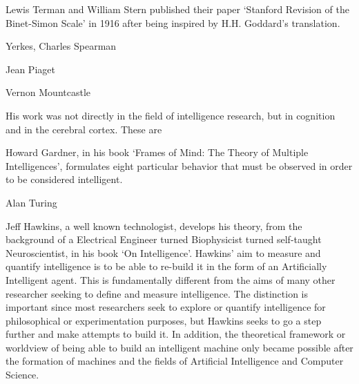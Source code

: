 \documentclass[11pt, oneside]{article}
\begin{document}

\par Lewis Terman and William Stern published their paper `Stanford Revision of the Binet-Simon Scale' in 1916 after being inspired by H.H. Goddard's translation.

\par Yerkes, Charles Spearman


\par Jean Piaget


\par Vernon Mountcastle 
\par His work was not directly in the field of intelligence research, but in cognition and in the cerebral cortex. These are 


\par Howard Gardner, in his book `Frames of Mind: The Theory of Multiple Intelligences', formulates eight particular behavior that must be observed in order to be considered intelligent. 


\par Alan Turing


\par Jeff Hawkins, a well known technologist, develops his theory, from the background of a Electrical Engineer turned Biophysicist turned self-taught Neuroscientist, in his book `On Intelligence'. Hawkins' aim to measure and quantify intelligence is to be able to re-build it in the form of an Artificially Intelligent agent. This is fundamentally different from the aims of many other researcher seeking to define and measure intelligence. The distinction is important since most researchers seek to explore or quantify intelligence for philosophical or experimentation purposes, but Hawkins seeks to go a step further and make attempts to build it. In addition, the theoretical framework or worldview of being able to build an intelligent machine only became possible after the formation of machines and the fields of Artificial Intelligence and Computer Science.
\end{document}
